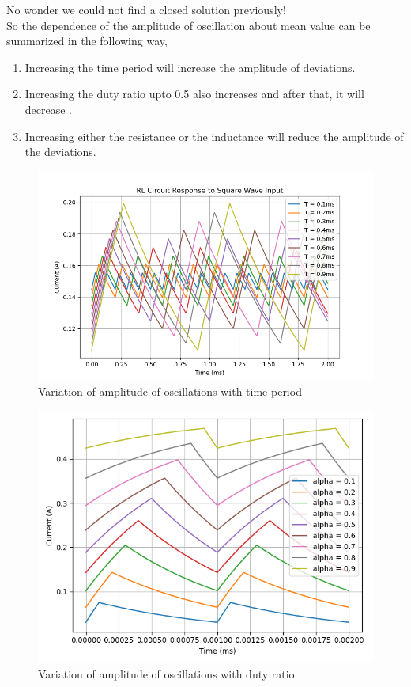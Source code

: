     No wonder we could not find a closed solution previously!\\
    \quad\newline
    So the dependence of the amplitude of oscillation about mean value can be summarized in the following way,
    \begin{enumerate}
        \item Increasing the time period will increase the amplitude of deviations.
        \item Increasing the duty ratio upto 0.5 also increases and after that, it will decrease .
        \item Increasing either the resistance or the inductance will reduce the amplitude of the deviations.
    \end{enumerate}
    \begin{figure}
        \centering
        \includegraphics[width=0.8\linewidth]{figs/time-period_variation.png}
        \caption{Variation of amplitude of oscillations with time period}
        \label{fig:enter-label}
    \end{figure}
    \begin{figure}
        \centering
        \includegraphics[width=0.8\linewidth]{figs/alpha_variation.png}
        \caption{Variation of amplitude of oscillations with duty ratio}
        \label{fig:enter-label}
    \end{figure}